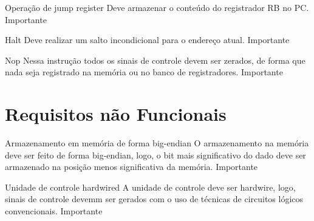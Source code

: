 \documentclass{report}
\begin{document}
\begin{functional}
       \requirement
      {Operação de jump register}
      {Deve armazenar o conteúdo do registrador RB no PC.}
      {Importante}
      
      \requirement
      {Halt}
      {Deve realizar um salto incondicional para o endereço atual.}
      {Importante}
      
      \requirement
      {Nop}
      {Nessa instrução todos os sinais de controle devem ser zerados, de forma que nada seja registrado na memória ou no banco de registradores.}
      {Importante}
      
    \end{functional}

\section{Requisitos não Funcionais}

  \begin{nonfunctional}
    \requirement
    {Armazenamento em memória de forma big-endian}
    {O armazenamento na memória deve ser feito de forma big-endian, logo, o bit mais significativo do dado deve ser armazenado na posição menos significativa da memória.}
    {Importante}

    \requirement
    {Unidade de controle hardwired}
    {A unidade de controle deve ser hardwire, logo, sinais de controle devemm ser gerados com o uso de técnicas de circuitos lógicos convencionais.}
    {Importante}
  \end{nonfunctional}


% 
% 
\end{document}
